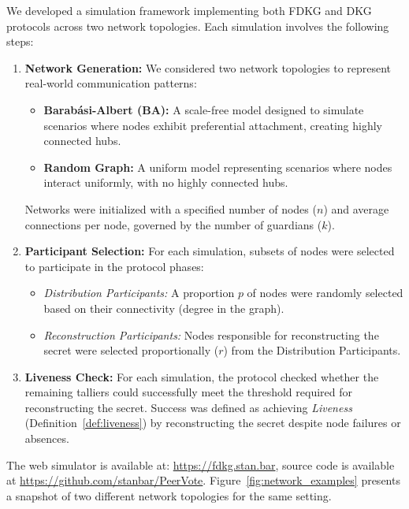 \documentclass[lettersize,journal]{IEEEtran}
\theoremstyle{definition}
\begin{document}
We developed a simulation framework implementing both FDKG and DKG protocols across two network topologies. Each simulation involves the following steps:


\begin{enumerate}
    \item \textbf{Network Generation:} We considered two network topologies to represent real-world communication patterns:
    \begin{itemize}
        \item \textbf{Barabási-Albert (BA):} A scale-free model designed to simulate scenarios where nodes exhibit preferential attachment, creating highly connected hubs.
        \item \textbf{Random Graph:} A uniform model representing scenarios where nodes interact uniformly, with no highly connected hubs.
    \end{itemize}
    
    Networks were initialized with a specified number of nodes ($n$) and average connections per node, governed by the number of guardians ($k$). 
    \item \textbf{Participant Selection:} For each simulation, subsets of nodes were selected to participate in the protocol phases:
    \begin{itemize}
        \item \emph{Distribution Participants:} A proportion $p$ of nodes were randomly selected based on their connectivity (degree in the graph).
        \item \emph{Reconstruction Participants:} Nodes responsible for reconstructing the secret were selected proportionally ($r$) from the Distribution Participants.
    \end{itemize}
    
    \item \textbf{Liveness Check:} For each simulation, the protocol checked whether the remaining talliers could successfully meet the threshold required for reconstructing the secret. Success was defined as achieving \emph{Liveness} (Definition~\ref{def:liveness}) by reconstructing the secret despite node failures or absences.
\end{enumerate}

The web simulator is available at: \url{https://fdkg.stan.bar}, source code is available at \url{https://github.com/stanbar/PeerVote}. Figure~\ref{fig:network_examples} presents a snapshot of two different network topologies for the same setting.
\end{document}
